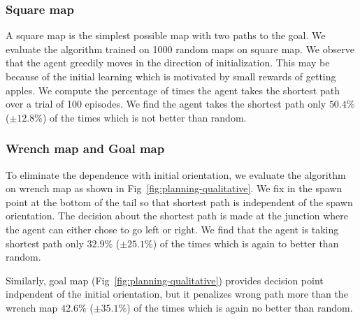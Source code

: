 \subsubsection{Square map}
A square map is the simplest possible map with two paths to the goal.
We evaluate the algorithm trained on 1000 random maps on square map.
We observe that the agent greedily moves in the direction of
initialization.
This may be because of the initial learning which is
motivated by small rewards of getting apples.
We compute the percentage of times the agent takes the shortest path over a trial of 100 episodes.
We find the agent takes the shortest path only $50.4$\% ($\pm 12.8$\%) of the times which is not better than random.

\subsubsection{Wrench map and Goal map}
To eliminate the dependence with initial orientation, we evaluate the algorithm on wrench map as shown in Fig~\ref{fig:planning-qualitative}. We fix in the spawn point at the bottom of the tail so that shortest path is independent of the spawn orientation.
The decision about the shortest path is made at the junction where the agent can either chose to go left or right.
We find that the agent is taking shortest path only $32.9$\% ($\pm 25.1$\%) of the times which is again to better than random.

Similarly, goal map (Fig~\ref{fig:planning-qualitative}) provides decision point indpendent of the initial orientation, but it penalizes wrong path more than the wrench map $42.6$\% ($\pm 35.1$\%) of the times which is again no better than random.
% 

